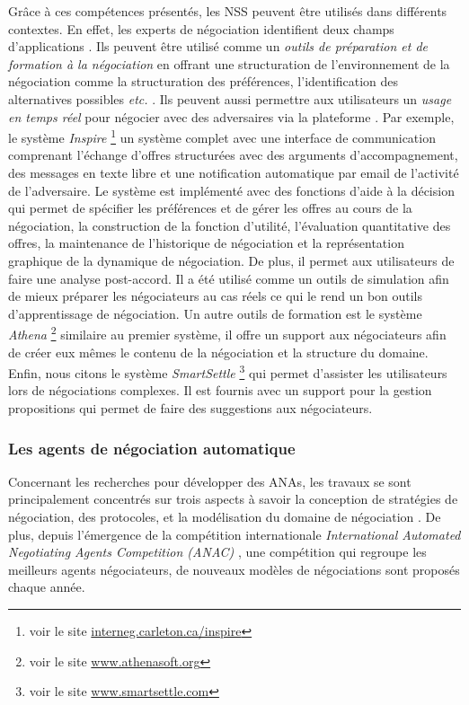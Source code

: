 			 Grâce à ces compétences présentés, les NSS peuvent être utilisés dans différents contextes. En effet, les experts de négociation identifient deux champs d'applications \cite{pommeranz2009design}. Ils peuvent être utilisé comme un \textit{outils de préparation et de formation à la négociation} en offrant une structuration de l'environnement de la négociation comme la structuration des préférences, l'identification des alternatives possibles \emph{etc.} \cite{broekens2010affective}.  Ils peuvent aussi permettre aux utilisateurs un \textit{usage en temps réel} pour négocier avec des adversaires via la plateforme \cite{pommeranz2009design}. 
			 Par exemple, le système \emph{Inspire} \footnote{ voir le site \url{interneg.carleton.ca/inspire}} un système complet avec une interface de communication comprenant l'échange d'offres structurées avec des arguments d'accompagnement, des messages en texte libre et une notification automatique par email de l'activité de l'adversaire. Le système est implémenté avec des fonctions d'aide à la décision qui permet de spécifier les préférences et de gérer les offres au cours de la négociation, la construction de la fonction d'utilité, l'évaluation quantitative des offres, la maintenance de l'historique de négociation et la représentation graphique de la dynamique de négociation. De plus, il permet aux utilisateurs de faire une analyse post-accord. 
			 Il a été utilisé comme  un outils de simulation afin de mieux préparer les négociateurs au cas réels ce qui le rend un bon outils d'apprentissage de négociation. 
			 Un autre outils de formation est le système \emph{Athena} \footnote{ voir le site \url{www.athenasoft.org}} similaire au premier système, il offre un support aux négociateurs afin de créer eux mêmes le contenu de la négociation et la structure du domaine. Enfin, nous citons le système \emph{SmartSettle} \footnote{ voir le site \url{www.smartsettle.com}} qui permet d'assister les utilisateurs lors de négociations complexes. Il est fournis avec un support pour la gestion propositions qui permet de faire des suggestions aux négociateurs. 
			 
			
	  \subsubsection{Les agents de négociation automatique}
	  
			Concernant les recherches pour développer des ANAs, les travaux se sont principalement concentrés sur trois aspects à savoir la conception de stratégies de négociation, des protocoles, et la modélisation du domaine de négociation \cite{jonker2012negotiating}. De plus, depuis l'émergence de la compétition internationale \emph{International Automated Negotiating Agents Competition (ANAC)} \cite{baarslag2012first,fujita2013second}, une compétition qui regroupe les meilleurs agents négociateurs, de nouveaux modèles de négociations sont proposés chaque année. 
			
